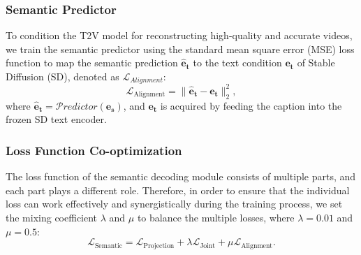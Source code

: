 \documentclass{article}
\begin{document}
\subsubsection{Semantic Predictor}
To condition the T2V model for reconstructing high-quality and accurate videos, we train the semantic predictor using the standard mean square error (MSE) loss function to map the semantic prediction $\mathbf{\hat{e}_t}$ to the text condition $\mathbf{e_{t}}$ of Stable Diffusion (SD), denoted as $\mathcal{L}_{Alignment}$:
\begin{equation}
\mathcal{L}_{\text{{Alignment}}} =\| \mathbf{\hat{e}_t}-\mathbf{e_{t}}\|_2^2,
\end{equation}
where $\mathbf{\hat{e}_t} = \mathcal{P}redictor(\mathbf{e_s})$, and $\mathbf{e_t}$ is acquired by feeding the caption into the frozen SD text encoder.

\subsubsection{Loss Function Co-optimization}
The loss function of the semantic decoding module consists of multiple parts, and each part plays a different role. Therefore, in order to ensure that the individual loss can work effectively and synergistically during the training process, we set the mixing coefficient $\mathcal{\lambda}$ and $\mathcal{\mu}$ to balance the multiple losses, where $\mathcal{\lambda} = 0.01$ and $\mathcal{\mu} = 0.5$: 
\begin{equation}
\mathcal{L}_{\text{Semantic}} = \mathcal{L}_{\text{Projection}} + \mathcal{\lambda}\mathcal{L}_{\text{Joint}} + \mathcal{\mu}\mathcal{L}_{\text{Alignment}}.
\end{equation}
\end{document}
